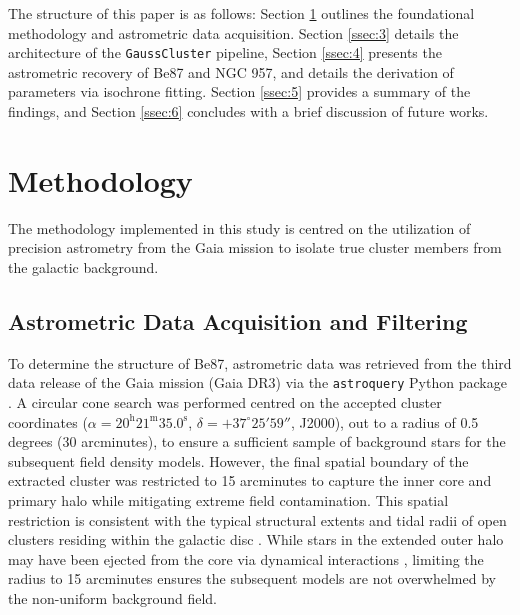 \documentclass{CU_IOPStyle_PXT999}
\begin{document}
The structure of this paper is as follows: Section \ref{ssec:2} outlines the foundational methodology and astrometric data acquisition. Section \ref{ssec:3} details the architecture of the \texttt{GaussCluster} pipeline, Section \ref{ssec:4} presents the astrometric recovery of Be87 and NGC 957, and details the derivation of parameters via isochrone fitting. Section \ref{ssec:5} provides a summary of the findings, and Section \ref{ssec:6} concludes with a brief discussion of future works.

\section{Methodology}
\label{ssec:2}
The methodology implemented in this study is centred on the utilization of precision astrometry from the Gaia mission to isolate true cluster members from the galactic background.

\subsection{Astrometric Data Acquisition and Filtering}
\label{ssec:2.1}
To determine the structure of Be87, astrometric data was retrieved from the third data release of the Gaia mission (Gaia DR3) \cite{gaia_collaboration_gaia_2023} via the \texttt{astroquery} Python package \cite{ginsburg_astroquery_2019}. A circular cone search was performed centred on the accepted cluster coordinates ($\alpha = 20^\text{h} 21^\text{m} 35.0^\text{s}$, $\delta = +37^\circ 25' 59''$, J2000)\cite{Tarricq_2021}, out to a radius of 0.5 degrees (30 arcminutes), to ensure a sufficient sample of background stars for the subsequent field density models. However, the final spatial boundary of the extracted cluster was restricted to 15 arcminutes to capture the inner core and primary halo while mitigating extreme field contamination. This spatial restriction is consistent with the typical structural extents and tidal radii of open clusters residing within the galactic disc \cite{Tadross01062014}. While stars in the extended outer halo may have been ejected from the core via dynamical interactions \cite{spitzer_1987, baumgardt_2003, oh_kroupa_2016}, limiting the radius to 15 arcminutes ensures the subsequent models are not overwhelmed by the non-uniform background field.
\end{document}
